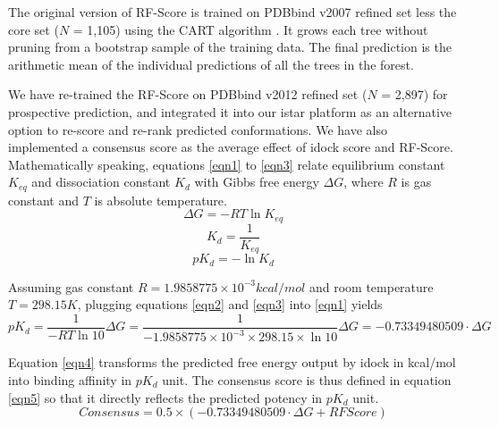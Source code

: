 \documentclass[10pt]{article}
\begin{document}
The original version of RF-Score \cite{564} is trained on PDBbind v2007 refined set less the core set ($N$ = 1,105) using the CART algorithm \cite{1310}. It grows each tree without pruning from a bootstrap sample of the training data. The final prediction is the arithmetic mean of the individual predictions of all the trees in the forest.

We have re-trained the RF-Score on PDBbind v2012 refined set ($N$ = 2,897) for prospective prediction, and integrated it into our istar platform as an alternative option to re-score and re-rank predicted conformations. We have also implemented a consensus score as the average effect of idock score and RF-Score. Mathematically speaking, equations \eqref{eqn1} to \eqref{eqn3} relate equilibrium constant $K_{eq}$ and dissociation constant $K_d$ with Gibbs free energy $\Delta G$, where $R$ is gas constant and $T$ is absolute temperature.
\begin{equation}
\label{eqn1}
\Delta G = -RT\ln K_{eq}
\end{equation}
\begin{equation}
\label{eqn2}
K_d = \frac{1}{K_{eq}}
\end{equation}
\begin{equation}
\label{eqn3}
pK_d = -\ln K_d
\end{equation}

Assuming gas constant $R = 1.9858775 \times 10^{-3} kcal/mol$ and room temperature $T = 298.15K$, plugging equations \eqref{eqn2} and \eqref{eqn3} into \eqref{eqn1} yields
\begin{equation}
\label{eqn4}
pK_d = \frac{1}{-RT\ln 10}\Delta G = \frac{1}{-1.9858775 \times 10^{-3} \times 298.15 \times \ln 10}\Delta G = -0.73349480509 \cdot \Delta G
\end{equation}

Equation \eqref{eqn4} transforms the predicted free energy output by idock in kcal/mol into binding affinity in $pK_d$ unit. The consensus score is thus defined in equation \eqref{eqn5} so that it directly reflects the predicted potency in $pK_d$ unit.
\begin{equation}
\label{eqn5}
Consensus = 0.5 \times (-0.73349480509 \cdot \Delta G + RFScore)
\end{equation}
\end{document}
